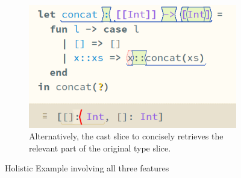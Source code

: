 {\begin{figure}[H]
\begin{subfigure}{0.49\textwidth}
\end{subfigure}
\begin{subfigure}{0.49\textwidth}
\centering
\includegraphics[width=1\textwidth]{Media/Figures/concat_error_cast_slice}
\caption{Alternatively, the cast slice to  concisely retrieves the relevant part of the original type slice.}
\end{subfigure}
\caption{Holistic Example involving all three features}
\label{fig:ConcatError}
\end{figure}}

